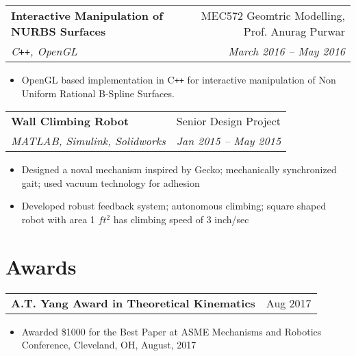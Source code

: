 \documentclass[letterpaper,10pt]{article}
\makeatletter
\newcommand{\resumeHeading}[4]{
  \vspace{-1pt}
    \begin{tabular*}{0.97\textwidth}{l@{\extracolsep{\fill}}r}
      \textbf{#1} & #2 \vspace{-2pt}\\ \vspace{1pt}
      \textit{\small#3} & \textit{\small #4} \\
    \end{tabular*}
}
\newcommand{\resumeSubheadingWithDate}[2]{
    \begin{tabular*}{0.97\textwidth}{l@{\extracolsep{\fill}}r}
      \small\textbf{#1} & \small #2 \\
    \end{tabular*}
    \vspace{+2pt}
}
\newcommand{\resumeSection}[1]{
\vspace{-12pt}
\section{\textbf{#1}}
}
\newcommand{\resumeItemListStart}{
\vspace{-7pt}
\begin{itemize}[leftmargin=14pt]
}
\newcommand{\resumeItemListEnd}{
\vspace{+7pt}
\end{itemize}
}
\newcommand{\resumeItem}[1]{
  \item\small{
      {#1 \vspace{-7pt}
      }
  }
}
\makeatother
\begin{document}
    \resumeHeading{Interactive Manipulation of NURBS Surfaces}{MEC572 Geomtric Modelling, Prof. Anurag Purwar}{C\texttt{++}, OpenGL}{March 2016 -- May 2016}
    \resumeItemListStart
      \resumeItem{OpenGL based implementation in C\texttt{++} for interactive manipulation of Non Uniform Rational B-Spline Surfaces.}
    \resumeItemListEnd

    \resumeHeading{Wall Climbing Robot}{Senior Design Project}{MATLAB, Simulink, Solidworks}{Jan 2015 -- May 2015}
    \resumeItemListStart
      \resumeItem{Designed a noval mechanism inspired by Gecko; mechanically synchronized gait; used vacuum technology for adhesion}
      \resumeItem{Developed robust feedback system; autonomous climbing; square shaped robot with area 1 $ft^2$ has climbing speed of 3 inch/sec}
    \resumeItemListEnd


\resumeSection{Awards}
    \resumeSubheadingWithDate{A.T. Yang Award in Theoretical Kinematics}{Aug 2017}
    \resumeItemListStart
      \resumeItem{Awarded \$1000 for the Best Paper at ASME Mechanisms and Robotics Conference, Cleveland, OH, August, 2017}
    \resumeItemListEnd
\end{document}
